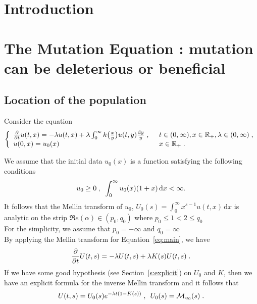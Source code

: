 \documentclass[11pt]{amsart}
\renewcommand{\Re}{\mathfrak{R}e}
\newcommand{\diff}{\,\mathrm{d}}
\begin{document}




\section{Introduction}



\section{The Mutation Equation : mutation can be deleterious or beneficial}

\subsection{Location of the population}

Consider the equation
\begin{equation}\left\{
    \begin{array}{ll}
	\frac{\partial}{\partial t}u(t,x) = - \lambda u(t,x) + \lambda \int_{0}^{\infty} k\big( \frac{x}{y}\big)u(t,y) \frac{\mathrm dy}{y}
	\; , \enspace
	& t \in (0, \infty), x \in \mathbb{R}_+, \lambda \in (0, \infty) \; ,
	\\
	u(0, x) = u_0(x)
	& x \in \mathbb{R}_+
	\; .
    \end{array}
	\right.
    \label{eq:main}
\end{equation}

We assume that the initial data $u_0(x)$ is a function satisfying the following conditions 
$$ u_0 \geq 0 \eqsepv \int_0^\infty u_0(x)(1+x)\diff x < \infty.$$
It follows that the Mellin transform of $u_0$, $U_0(s)= \int_0^\infty x^{s-1}u(t,x)\diff x$ is analytic on the strip $\Re(\alpha) \in (p_0,q_0)$ where $p_0 \leq 1 < 2 \leq q_0$ \\
For the simplicity, we assume that 
$ p_0=-\infty$ and $q_0 = \infty$\\

By applying the Mellin transform for Equation~\eqref{eq:main}, we have
	\begin{equation}
		\frac{\partial}{\partial t} U(t,s) = - \lambda U(t,s) + \lambda K(s) U(t,s)
		\; .
        \label{eq:explicit_reconstruction}
	\end{equation}
If we have some good hypothesis (see Section~\ref{s:explicit}) on $U_0$ and $K$, then we have an explicit formula for the inverse Mellin transform and it follows that
    \begin{equation*}
        U(t,s) = U_0(s) e^{-\lambda t(1 - K(s) ) }
        \; , \enspace
        U_0(s) = \mathcal{M}_{u_0}(s)
        \; .
    \end{equation*}
\end{document}
